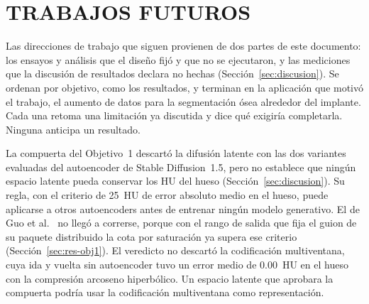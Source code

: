 \chapter*{\center \Large TRABAJOS FUTUROS}


Las direcciones de trabajo que siguen provienen de dos partes de este documento: los ensayos y análisis que el diseño fijó y que no se ejecutaron, y las mediciones que la discusión de resultados declara no hechas (Sección~\ref{sec:discusion}). Se ordenan por objetivo, como los resultados, y terminan en la aplicación que motivó el trabajo, el aumento de datos para la segmentación ósea alrededor del implante. Cada una retoma una limitación ya discutida y dice qué exigiría completarla. Ninguna anticipa un resultado.


La compuerta del Objetivo~1 descartó la difusión latente con las dos variantes evaluadas del autoencoder de Stable Diffusion~1.5, pero no establece que ningún espacio latente pueda conservar los HU del hueso (Sección~\ref{sec:discusion}). Su regla, con el criterio de 25~HU de error absoluto medio en el hueso, puede aplicarse a otros autoencoders antes de entrenar ningún modelo generativo. El de Guo et al.~\cite{guo2025maisi} no llegó a correrse, porque con el rango de salida que fija el guion de su paquete distribuido la cota por saturación ya supera ese criterio (Sección~\ref{sec:res-obj1}). El veredicto no descartó la codificación multiventana, cuya ida y vuelta sin autoencoder tuvo un error medio de 0.00~HU en el hueso con la compresión arcoseno hiperbólico. Un espacio latente que aprobara la compuerta podría usar la codificación multiventana como representación.


